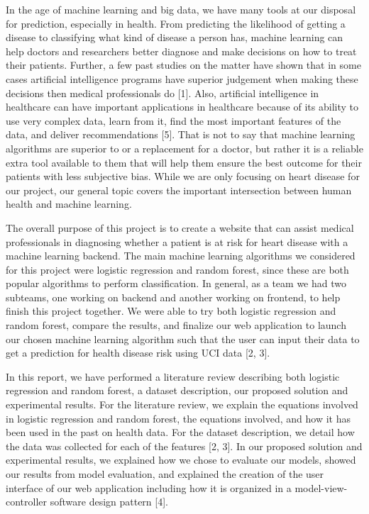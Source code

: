 \documentclass[12pt]{article}
\begin{document}
\hspace{\parindent} In the age of machine learning and big data, we have many tools at our 
disposal for prediction, especially in health. From predicting the 
likelihood of getting a disease to classifying what kind of disease a 
person has, machine learning can help doctors and researchers better 
diagnose and make decisions on how to treat their patients. Further, a few 
past studies on the matter have shown that in some cases artificial 
intelligence programs have superior judgement when making these decisions 
then medical professionals do [1]. Also, artificial intelligence in 
healthcare can have important applications in healthcare because of 
its ability to use very complex data, learn from it, find the most 
important features of the data, and deliver recommendations [5]. 
That is not to say that machine learning algorithms are superior to or a 
replacement for a doctor, but rather it is a reliable extra tool available 
to them that will help them ensure the best outcome for their patients 
with less subjective bias. While we are only focusing on heart disease 
for our project, our general topic covers the important intersection 
between human health and machine learning. 
\par
    The overall purpose of this project is to create a website that can assist 
medical professionals in diagnosing whether a patient is at risk for heart 
disease with a machine learning backend. The main machine learning 
algorithms we considered for this project were logistic regression 
and random forest, since these are both popular algorithms to perform 
classification. In general, as a team we had two subteams, one working on 
backend and another working on frontend, to help finish this project 
together. We were able to try both logistic regression and random forest, 
compare the results, and finalize our web application to launch our chosen 
machine learning algorithm such that the user can input their data to get 
a prediction for health disease risk using UCI data [2, 3]. 
\par
    In this report, we have performed a literature review describing both 
logistic regression and random forest, a dataset description, our 
proposed solution and experimental results. For the literature review, 
we explain the equations involved in logistic regression and random forest,
the equations involved, and how it has been used in the past on health 
data. For the dataset description, we detail how the data was collected 
for each of the features [2, 3]. In our proposed solution and experimental 
results, we explained how we chose to evaluate our models, showed our 
results from model evaluation, and explained the creation of the user 
interface of our web application including how it is organized in a 
model-view-controller software design pattern [4].
\end{document}
